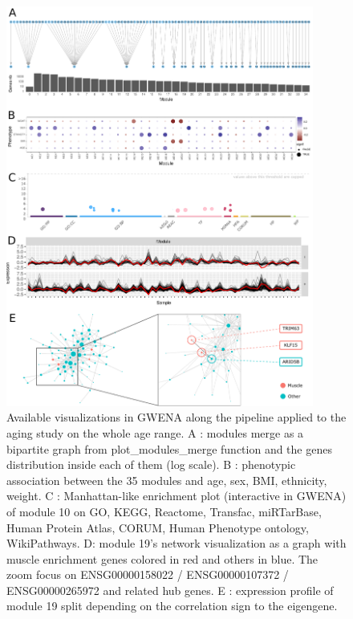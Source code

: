 \begin{figure}[p]
    \centering
    \includegraphics[width=0.90\textwidth]{img/chap1/figure_2.pdf}
    \caption[Available visualizations in GWENA along the pipeline applied to the aging study on the whole age range]{Available visualizations in GWENA along the pipeline applied to the aging study on the whole age range. A : modules merge as a bipartite graph from plot\_modules\_merge function and the genes distribution inside each of them (log scale). B : phenotypic association between the 35 modules and age, sex, BMI, ethnicity, weight. C : Manhattan-like enrichment plot (interactive in GWENA) of module 10 on GO, KEGG, Reactome, Transfac, miRTarBase, Human Protein Atlas, CORUM, Human Phenotype ontology, WikiPathways. D: module 19's network visualization as a graph with muscle enrichment genes colored in red and others in blue. The zoom focus on ENSG00000158022 / ENSG00000107372 / ENSG00000265972 and related hub genes. E : expression profile of module 19 split depending on the correlation sign to the eigengene.}
    \label{fig:fig_resume_visu}
\end{figure}


